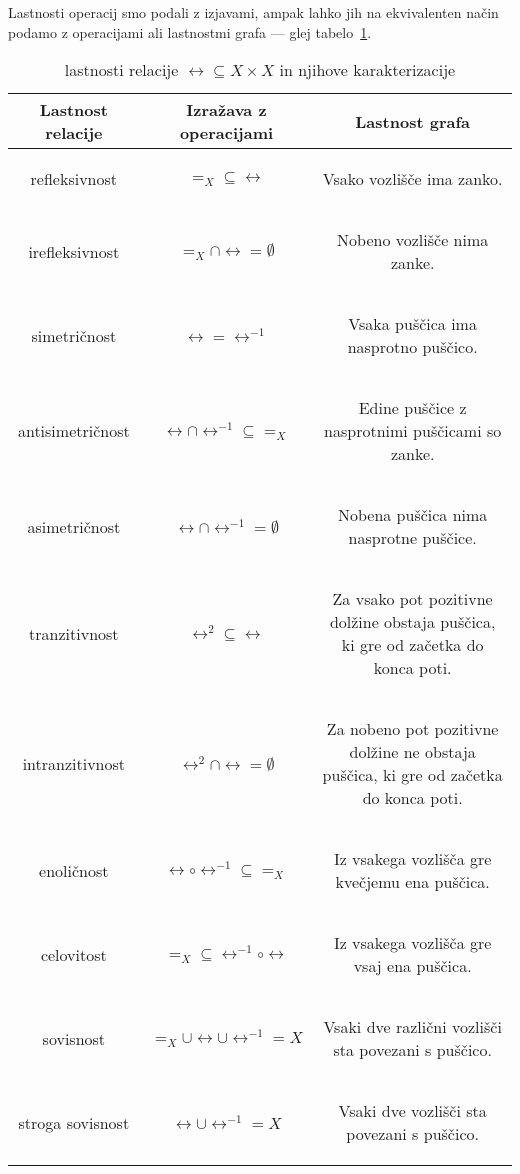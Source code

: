 		Lastnosti operacij smo podali z izjavami, ampak lahko jih na ekvivalenten način podamo z operacijami ali lastnostmi grafa --- glej tabelo~\ref{TABELA: lastnosti relacije}.
		
		\begin{table}[!ht]
			\centering
			\newcommand{\opis}[1]{\begin{minipage}{0.45\textwidth}\begin{center}{#1}\end{center}\end{minipage}}
			\def\arraystretch{3}
			\begin{tabular}{|ccc|}
				\hline
				\textbf{Lastnost relacije} & \textbf{Izražava z operacijami} & \textbf{Lastnost grafa} \\
				\hline
				refleksivnost & $=_X \subseteq \rel$ & \opis{Vsako vozlišče ima zanko.} \\
				irefleksivnost & $=_X \cap \rel = \emptyset$ & \opis{Nobeno vozlišče nima zanke.} \\
				simetričnost & $\rel = \rel^{-1}$ & \opis{Vsaka puščica ima nasprotno puščico.} \\
				antisimetričnost & $\rel \cap \rel^{-1} \subseteq =_X$ & \opis{Edine puščice z nasprotnimi puščicami so zanke.} \\
				asimetričnost & $\rel \cap \rel^{-1} = \emptyset$ & \opis{Nobena puščica nima nasprotne puščice.} \\
				tranzitivnost & $\rel^2 \subseteq \rel$ & \opis{Za vsako pot pozitivne dolžine obstaja puščica, ki gre od začetka do konca poti.} \\
				intranzitivnost & $\rel^2 \cap \rel = \emptyset$ & \opis{Za nobeno pot pozitivne dolžine ne obstaja puščica, ki gre od začetka do konca poti.} \\
				enoličnost & $\rel \circ \rel^{-1} \subseteq =_X$ & \opis{Iz vsakega vozlišča gre kvečjemu ena puščica.} \\
				celovitost & $=_X \subseteq \rel^{-1} \circ \rel$ & \opis{Iz vsakega vozlišča gre vsaj ena puščica.} \\
				sovisnost & $=_X \cup \rel \cup \rel^{-1} = X$ & \opis{Vsaki dve različni vozlišči sta povezani s puščico.} \\
				stroga sovisnost & $\rel \cup \rel^{-1} = X$ & \opis{Vsaki dve vozlišči sta povezani s puščico.} \\
				\hline
			\end{tabular}
			\caption{lastnosti relacije $\rel \subseteq X \times X$ in njihove karakterizacije}\label{TABELA: lastnosti relacije}
		\end{table}
		
